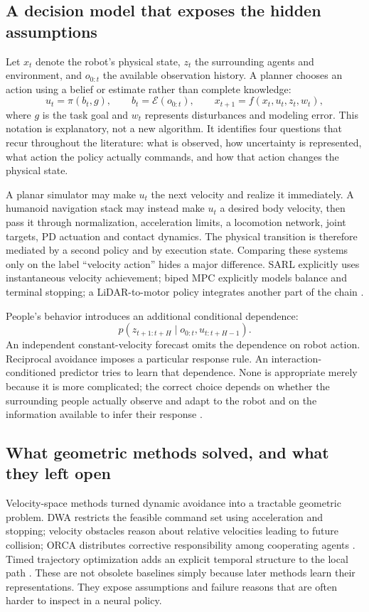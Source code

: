 \subsection{A decision model that exposes the hidden assumptions}
Let $x_t$ denote the robot's physical state, $z_t$ the surrounding agents and
environment, and $o_{0:t}$ the available observation history. A planner chooses
an action using a belief or estimate rather than complete knowledge:
\begin{equation}
u_t=\pi(b_t,g),\qquad b_t=\mathcal{E}(o_{0:t}),\qquad
x_{t+1}=f(x_t,u_t,z_t,w_t),
\end{equation}
where $g$ is the task goal and $w_t$ represents disturbances and modeling error.
This notation is explanatory, not a new algorithm. It identifies four questions
that recur throughout the literature: what is observed, how uncertainty is
represented, what action the policy actually commands, and how that action changes
the physical state.

A planar simulator may make $u_t$ the next velocity and realize it immediately.
A humanoid navigation stack may instead make $u_t$ a desired body velocity,
then pass it through normalization, acceleration limits, a locomotion network,
joint targets, PD actuation and contact dynamics. The physical transition is
therefore mediated by a second policy and by execution state. Comparing these
systems only on the label ``velocity action'' hides a major difference.
SARL explicitly uses instantaneous velocity achievement; biped MPC explicitly
models balance and terminal stopping; a LiDAR-to-motor policy integrates another
part of the chain \citep{sarl,biped2016,safehumanoid}.

People's behavior introduces an additional conditional dependence:
\begin{equation}
p(z_{t+1:t+H}\mid o_{0:t},u_{t:t+H-1}).
\end{equation}
An independent constant-velocity forecast omits the dependence on robot action.
Reciprocal avoidance imposes a particular response rule. An interaction-conditioned
predictor tries to learn that dependence. None is appropriate merely because it
is more complicated; the correct choice depends on whether the surrounding
people actually observe and adapt to the robot and on the information available
to infer their response \citep{orca,trajectron,prediction}.

\subsection{What geometric methods solved, and what they left open}
Velocity-space methods turned dynamic avoidance into a tractable geometric
problem. DWA restricts the feasible command set using acceleration and stopping;
velocity obstacles reason about relative velocities leading to future collision;
ORCA distributes corrective responsibility among cooperating agents
\citep{dwa,vo,orca}. Timed trajectory optimization adds an explicit temporal
structure to the local path \citep{teb}. These are not obsolete baselines simply
because later methods learn their representations. They expose assumptions and
failure reasons that are often harder to inspect in a neural policy.

